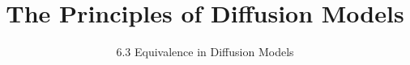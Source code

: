 ﻿%

\graphicspath{{../images/}}
\title{The Principles of Diffusion Models}
\subtitle{6.3 Equivalence in Diffusion Models}


\begin{frame}
    \titlepage
\end{frame}



